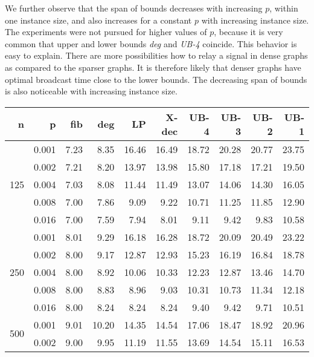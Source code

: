 We further observe that the span of bounds decreases with increasing $p$, within one instance size, and also increases for a constant $p$ with increasing instance size.
The experiments were not pursued for higher values of $p$, because it is very common that upper and lower bounds \emph{deg} and \emph{UB-4} coincide.
This behavior is easy to explain.
There are more possibilities how to relay a signal in dense graphs as compared to the sparser graphs. 
It is therefore likely that denser graphs have optimal broadcast time close to the lower bounds.
The decreasing span of bounds is also noticeable with increasing instance size.

\begin{table}[]
\centering
\begin{tabular}{rrrrrrrrrr}
n & p     & fib  & deg  & LP    & X-dec & UB-4  & UB-3  & UB-2  & UB-1  \\
\hline
\multirow{5}{*}{125} 
& 0.001 & 7.23 & 8.35 & 16.46 & 16.49 & 18.72 & 20.28 & 20.77 & 23.75 \\
& 0.002 & 7.21 & 8.20 & 13.97 & 13.98 & 15.80 & 17.18 & 17.21 & 19.50 \\
& 0.004 & 7.03 & 8.08 & 11.44 & 11.49 & 13.07 & 14.06 & 14.30 & 16.05 \\
& 0.008 & 7.00 & 7.86 & 9.09  & 9.22  & 10.71 & 11.25 & 11.85 & 12.90 \\
& 0.016 & 7.00 & 7.59 & 7.94  & 8.01  & 9.11  & 9.42  & 9.83  & 10.58 \\
\hline
\multirow{5}{*}{250} 
& 0.001 & 8.01 & 9.29 & 16.18 & 16.28 & 18.72 & 20.09 & 20.49 & 23.22 \\
& 0.002 & 8.00 & 9.17 & 12.87 & 12.93 & 15.23 & 16.19 & 16.84 & 18.78 \\
& 0.004 & 8.00 & 8.92 & 10.06 & 10.33 & 12.23 & 12.87 & 13.46 & 14.70 \\
& 0.008 & 8.00 & 8.83 & 8.96  & 9.03  & 10.31 & 10.73 & 11.34 & 12.18 \\
& 0.016 & 8.00 & 8.24 & 8.24  & 8.24  & 9.40  & 9.42  & 9.71  & 10.51 \\
\hline
\multirow{5}{*}{500} 
& 0.001 & 9.01 & 10.20 & 14.35 & 14.54 & 17.06 & 18.47 & 18.92 & 20.96 \\
& 0.002 & 9.00 & 9.95  & 11.19 & 11.55 & 13.69 & 14.54 & 15.11 & 16.53 \\

\end{tabular}
\end{table}
